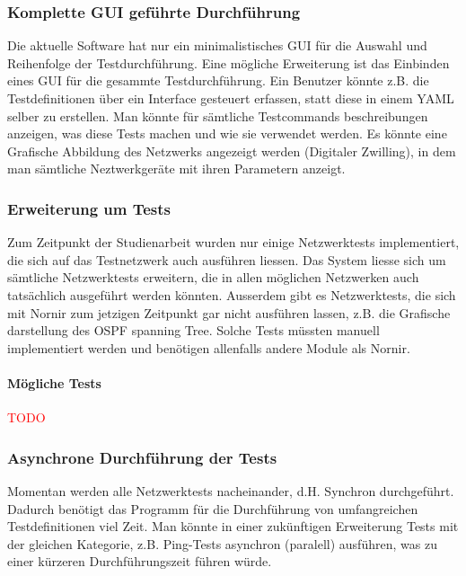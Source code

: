 \documentclass[]{subfiles}
\begin{document}
\subsubsection*{Komplette GUI geführte Durchführung}
Die aktuelle Software hat nur ein minimalistisches GUI für die Auswahl und Reihenfolge
der Testdurchführung. 
Eine mögliche Erweiterung ist das Einbinden eines GUI für die gesammte Testdurchführung.
Ein Benutzer könnte z.B. die Testdefinitionen über ein Interface gesteuert erfassen, 
statt diese in einem YAML selber zu erstellen. 
Man könnte für sämtliche Testcommands beschreibungen anzeigen, was diese Tests machen
und wie sie verwendet werden. 
Es könnte eine Grafische Abbildung des Netzwerks angezeigt werden (Digitaler Zwilling), 
in dem man sämtliche Neztwerkgeräte mit ihren Parametern anzeigt. 

\subsubsection*{Erweiterung um Tests}
Zum Zeitpunkt der Studienarbeit wurden nur einige Netzwerktests implementiert, die 
sich auf das Testnetzwerk auch ausführen liessen. 
Das System liesse sich um sämtliche Netzwerktests erweitern, die in allen möglichen 
Netzwerken auch tatsächlich ausgeführt werden könnten.
Ausserdem gibt es Netzwerktests, die sich mit Nornir zum jetzigen Zeitpunkt gar nicht
ausführen lassen, z.B. die Grafische darstellung des OSPF spanning Tree. 
Solche Tests müssten manuell implementiert werden und benötigen allenfalls andere 
Module als Nornir.

\paragraph{Mögliche Tests}
\textcolor{red}{TODO}

\subsubsection*{Asynchrone Durchführung der Tests}
Momentan werden alle Netzwerktests nacheinander, d.H. Synchron durchgeführt.
Dadurch benötigt das Programm für die Durchführung von umfangreichen Testdefinitionen 
viel Zeit.
Man könnte in einer zukünftigen Erweiterung Tests mit der gleichen Kategorie, z.B.
Ping-Tests asynchron (paralell) ausführen, was zu einer kürzeren Durchführungszeit 
führen würde. 
\end{document}
